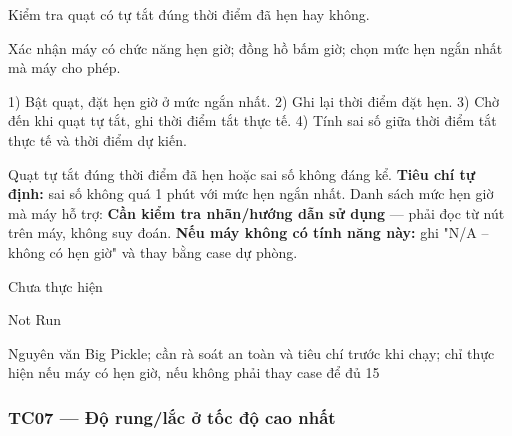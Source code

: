 \begin{description}
\tightlist
\item[Objective]
Kiểm tra quạt có tự tắt đúng thời điểm đã hẹn hay không.
\item[Input]
Xác nhận máy có chức năng hẹn giờ; đồng hồ bấm giờ; chọn mức hẹn ngắn nhất mà máy cho phép.
\item[Steps]
1) Bật quạt, đặt hẹn giờ ở mức ngắn nhất. 2) Ghi lại thời điểm đặt hẹn. 3) Chờ đến khi quạt tự tắt, ghi thời điểm tắt thực tế. 4) Tính sai số giữa thời điểm tắt thực tế và thời điểm dự kiến.
\item[Expected]
Quạt tự tắt đúng thời điểm đã hẹn hoặc sai số không đáng kể. \textbf{Tiêu chí tự định:} sai số không quá 1 phút với mức hẹn ngắn nhất. Danh sách mức hẹn giờ mà máy hỗ trợ: \textbf{Cần kiểm tra nhãn/hướng dẫn sử dụng} --- phải đọc từ nút trên máy, không suy đoán. \textbf{Nếu máy không có tính năng này:} ghi "N/A -- không có hẹn giờ" và thay bằng case dự phòng.
\item[Actual]
Chưa thực hiện
\item[Verdict]
Not Run
\item[Ghi chú rà soát]
Nguyên văn Big Pickle; cần rà soát an toàn và tiêu chí trước khi chạy; chỉ thực hiện nếu máy có hẹn giờ, nếu không phải thay case để đủ 15
\end{description}

\subsubsection{TC07 --- Độ rung/lắc ở tốc độ cao nhất}\label{tc07-ux111ux1ed9-runglux1eafc-ux1edf-tux1ed1c-ux111ux1ed9-cao-nhux1ea5t}

